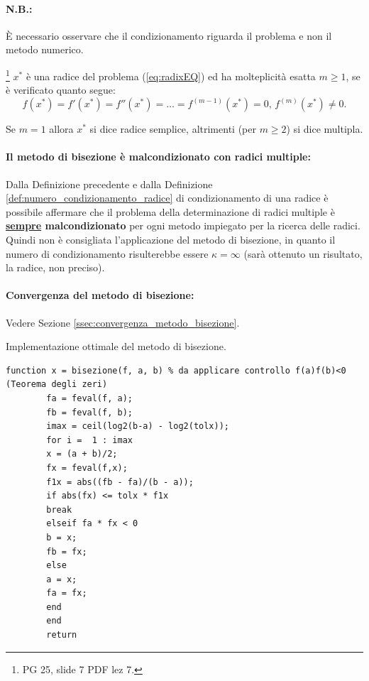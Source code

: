 \paragraph{N.B.:} È necessario osservare che il condizionamento riguarda il problema e non il \gls{metodo numerico}.

\begin{definition}\label{def:radice_molteplicita_m}
	\footnote{PG 25, slide 7 PDF lez 7.} $x^*$ è una radice del problema (\ref{eq:radixEQ}) ed ha molteplicità esatta $m\geq 1$, se è verificato quanto segue:
	\begin{equation*}
		f(x^*)=f'(x^*)=f''(x^*)=\hdots=f^{(m-1)}(x^*)=0,\, f^{(m)}(x^*)\neq 0.
	\end{equation*}
\end{definition}
Se $m=1$ allora $x^*$ si dice radice semplice, altrimenti (per $m\geq 2$) si dice multipla.

\paragraph{Il metodo di bisezione è malcondizionato con radici multiple:} Dalla Definizione precedente e dalla Definizione \ref{def:numero_condizionamento_radice} di condizionamento di una radice è possibile affermare che il problema della determinazione di radici multiple è \textbf{\underline{sempre} malcondizionato} per ogni metodo impiegato per la ricerca delle radici. Quindi non è consigliata l'applicazione del metodo di bisezione, in quanto il numero di condizionamento risulterebbe essere $\kappa=\infty$ (sarà ottenuto un risultato, la radice, non preciso).

\paragraph{Convergenza del metodo di bisezione:} Vedere Sezione \ref{ssec:convergenza_metodo_bisezione}.

\begin{algorithm}\caption{Implementazione ottimale del metodo di bisezione.}
	\label{alg:metodo_bisezione}
	\begin{lstlisting}[style=Matlab-editor]
		function x = bisezione(f, a, b) % da applicare controllo f(a)f(b)<0 (Teorema degli zeri)
		fa = feval(f, a);
		fb = feval(f, b);
		imax = ceil(log2(b-a) - log2(tolx));
		for i =  1 : imax
		x = (a + b)/2;
		fx = feval(f,x);
		f1x = abs((fb - fa)/(b - a));
		if abs(fx) <= tolx * f1x
		break
		elseif fa * fx < 0
		b = x;
		fb = fx;
		else
		a = x;
		fa = fx;
		end
		end
		return
	\end{lstlisting}
\end{algorithm}

